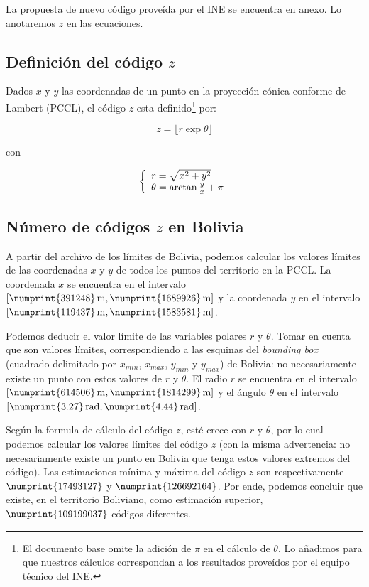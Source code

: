 \documentclass[letterpaper]{article}
\begin{document}
La propuesta de nuevo código proveída por el INE se encuentra en 
anexo. Lo anotaremos \(z\) en las ecuaciones.

\subsection{Definición del código \(z\)}

Dados \(x\) y \(y\) las coordenadas de un punto en la proyección 
cónica conforme de Lambert (PCCL)\cite[p.~33]{sunit07}, el código \(z\) 
esta definido\footnote{El documento base omite la adición de \(\pi\) 
en el cálculo de \(\theta\). Lo añadimos para que nuestros cálculos 
correspondan a los resultados proveídos por el equipo técnico del 
INE.} por:

\[z = \lfloor r \exp{\theta} \rfloor\]

con

\[
\left\{
\begin{array}{l l}
r = \sqrt{x^2+y^2} \\
\theta = \arctan{\frac{y}{x}} + \pi
\end{array} \right.
\]

\subsection{Número de códigos \(z\) en Bolivia}

A partir del archivo de los límites de Bolivia\cite
{datos:limites_bolivia}, podemos calcular los valores límites de las 
coordenadas \(x\) y \(y\) de todos los puntos del territorio en la 
PCCL. La coordenada \(x\) se 
encuentra en el intervalo \([\numprint{391248}\,\mathrm{m}, 
\numprint{1689926}\,\mathrm{m}]\) y la coordenada \(y\) en el 
intervalo \([\numprint{119437}\,\mathrm{m}, 
\numprint{1583581}\,\mathrm{m}]\).

Podemos deducir el valor límite de las variables polares \(r\) y \(
\theta\). Tomar en cuenta que son valores límites, correspondiendo a 
las esquinas del \emph{bounding box} (cuadrado delimitado por \(
x_{min}\), \(x_{max}\), \(y_{min}\) y \(y_{max}\)) de Bolivia: no 
necesariamente existe un punto con estos valores de \(r\) y \(\theta
\). El radio \(r\) se encuentra en el intervalo \(
[\numprint{614506}\,\mathrm{m}, \numprint{1814299}\,\mathrm{m}]\) y 
el ángulo \(\theta\) en el intervalo \(
[\numprint{3.27}\,\mathrm{rad}, \numprint{4.44}\,\mathrm{rad}]\).

Según la formula de cálculo del código \(z\), esté crece con \(r\) y 
\(\theta\), por lo cual podemos calcular los valores límites del 
código \(z\) (con la misma advertencia: no necesariamente existe un 
punto en Bolivia que tenga estos valores extremos del código). Las 
estimaciones mínima y máxima del código \(z\) son respectivamente \(
\numprint{17493127}\) y \(\numprint{126692164}\). Por ende, podemos 
concluir que existe, en el territorio Boliviano, como estimación 
superior, \(\numprint{109199037}\) códigos diferentes.
\end{document}
